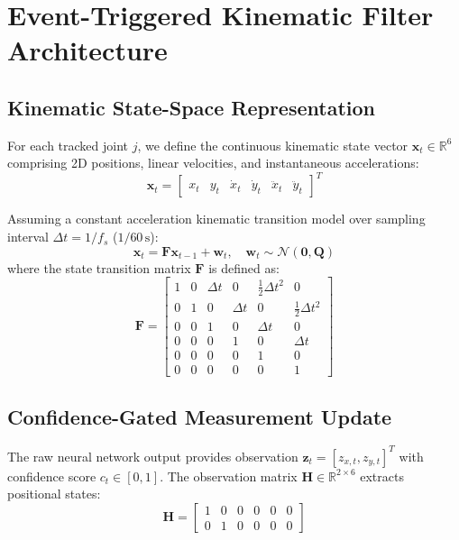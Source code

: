 \section{Event-Triggered Kinematic Filter Architecture}
\label{sec:ekf_formulation}

\subsection{Kinematic State-Space Representation}
For each tracked joint $j$, we define the continuous kinematic state vector $\mathbf{x}_t \in \mathbb{R}^6$ comprising 2D positions, linear velocities, and instantaneous accelerations:
\begin{equation}
    \mathbf{x}_t = \begin{bmatrix} x_t & y_t & \dot{x}_t & \dot{y}_t & \ddot{x}_t & \ddot{y}_t \end{bmatrix}^T
\end{equation}

Assuming a constant acceleration kinematic transition model over sampling interval $\Delta t = 1/f_s$ ($1/60\,\text{s}$):
\begin{equation}
    \mathbf{x}_t = \mathbf{F} \mathbf{x}_{t-1} + \mathbf{w}_t, \quad \mathbf{w}_t \sim \mathcal{N}(\mathbf{0}, \mathbf{Q})
\end{equation}
where the state transition matrix $\mathbf{F}$ is defined as:
\begin{equation}
    \mathbf{F} = \begin{bmatrix}
    1 & 0 & \Delta t & 0 & \frac{1}{2}\Delta t^2 & 0 \\
    0 & 1 & 0 & \Delta t & 0 & \frac{1}{2}\Delta t^2 \\
    0 & 0 & 1 & 0 & \Delta t & 0 \\
    0 & 0 & 0 & 1 & 0 & \Delta t \\
    0 & 0 & 0 & 0 & 1 & 0 \\
    0 & 0 & 0 & 0 & 0 & 1
    \end{bmatrix}
\end{equation}

\subsection{Confidence-Gated Measurement Update}
The raw neural network output provides observation $\mathbf{z}_t = [z_{x,t}, z_{y,t}]^T$ with confidence score $c_t \in [0, 1]$. The observation matrix $\mathbf{H} \in \mathbb{R}^{2 \times 6}$ extracts positional states:
\begin{equation}
    \mathbf{H} = \begin{bmatrix} 1 & 0 & 0 & 0 & 0 & 0 \\ 0 & 1 & 0 & 0 & 0 & 0 \end{bmatrix}
\end{equation}

